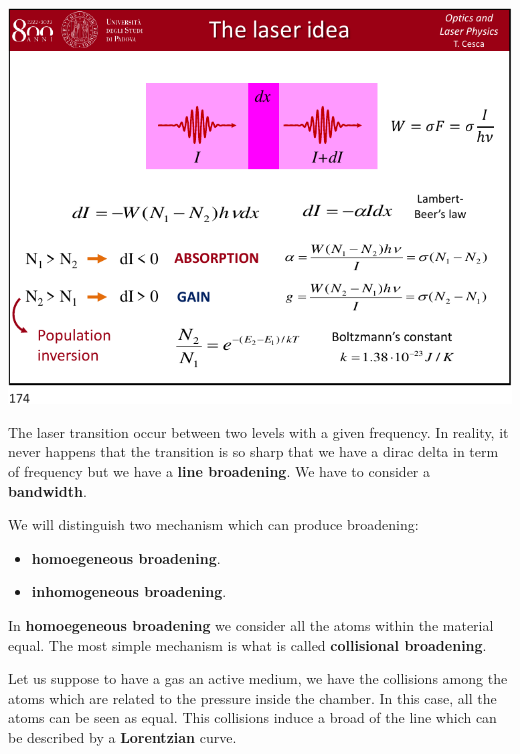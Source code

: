 \documentclass[../main/main.tex]{subfiles}
\begin{document}
\begin{minipage}[]{0.5\linewidth}
\centering
\includegraphics[page=6,width=1\textwidth]{../lessons/pdf_file/09_lecture.pdf}
\end{minipage}
\hspace{0.3cm}\vspace{0.3cm}
\begin{minipage}[c]{0.47\linewidth}

The laser transition occur between two levels with a given frequency. In reality, it never happens that the transition is so sharp that we have a dirac delta in term of frequency but we have a \textbf{line broadening}. We have to consider a \textbf{bandwidth}.

We will distinguish two mechanism which can produce broadening:

\begin{itemize}
\item \textbf{homoegeneous broadening}.
\item \textbf{inhomogeneous broadening}.
\end{itemize}

In \textbf{homoegeneous broadening} we consider all the atoms within the material equal. The most simple mechanism is what is called \textbf{collisional broadening}.

\end{minipage}

Let us suppose to have a gas an active medium, we have the collisions among the atoms which are related to the pressure inside the chamber. In this case, all the atoms can be seen as equal. This collisions induce a broad of the line which can be described by a \textbf{Lorentzian} curve.
\end{document}
